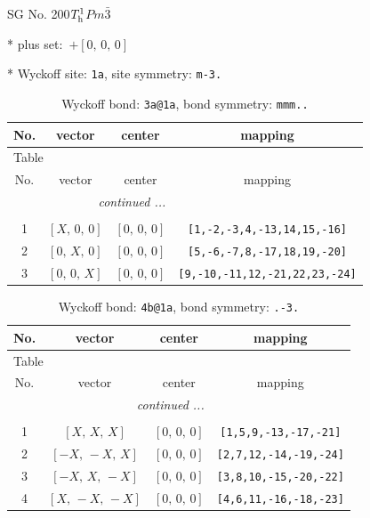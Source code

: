 \documentclass[fleqn,8pt]{jsarticle}
\begin{document}
\setcounter{MaxMatrixCols}{32}

\renewcommand{\tablename}{Table~}
\renewcommand{\figurename}{Figure~}
\begin{center}
\LARGE
SG No. 200\quad$T_{\rm h}^{1}$\quad$Pm\bar{3}$\quad[ cubic ]
\end{center}

* plus set:\,\,\,$+\left[ 0,\, 0,\, 0 \right]$


* Wyckoff site: {\tt 1a}, site symmetry: {\tt m-3.}
\renewcommand{\arraystretch}{1.2}
\begin{longtable}{cccc}
\caption{Wyckoff bond: {\tt 3a@1a}, bond symmetry: {\tt mmm..}}
 \\
 \hline \hline
No. & vector & center & mapping \\ \hline \endfirsthead

\multicolumn{3}{l}{\tablename\ \thetable{}} \\
 \hline \hline
No. & vector & center & mapping \\ \hline \endhead

 \hline \hline
\multicolumn{3}{r}{\footnotesize\it continued ...} \\ \endfoot

 \hline \hline
\multicolumn{3}{r}{} \\ \endlastfoot

1 & $\left[ X,\, 0,\, 0 \right]$ & $\left[ 0,\, 0,\, 0 \right]$ & {\tt [1,-2,-3,4,-13,14,15,-16]} \\ \hline
2 & $\left[ 0,\, X,\, 0 \right]$ & $\left[ 0,\, 0,\, 0 \right]$ & {\tt [5,-6,-7,8,-17,18,19,-20]} \\ \hline
3 & $\left[ 0,\, 0,\, X \right]$ & $\left[ 0,\, 0,\, 0 \right]$ & {\tt [9,-10,-11,12,-21,22,23,-24]} \\
\end{longtable}
\renewcommand{\arraystretch}{1.2}
\begin{longtable}{cccc}
\caption{Wyckoff bond: {\tt 4b@1a}, bond symmetry: {\tt .-3.}}
 \\
 \hline \hline
No. & vector & center & mapping \\ \hline \endfirsthead

\multicolumn{3}{l}{\tablename\ \thetable{}} \\
 \hline \hline
No. & vector & center & mapping \\ \hline \endhead

 \hline \hline
\multicolumn{3}{r}{\footnotesize\it continued ...} \\ \endfoot

 \hline \hline
\multicolumn{3}{r}{} \\ \endlastfoot

1 & $\left[ X,\, X,\, X \right]$ & $\left[ 0,\, 0,\, 0 \right]$ & {\tt [1,5,9,-13,-17,-21]} \\ \hline
2 & $\left[ - X,\, - X,\, X \right]$ & $\left[ 0,\, 0,\, 0 \right]$ & {\tt [2,7,12,-14,-19,-24]} \\ \hline
3 & $\left[ - X,\, X,\, - X \right]$ & $\left[ 0,\, 0,\, 0 \right]$ & {\tt [3,8,10,-15,-20,-22]} \\ \hline
4 & $\left[ X,\, - X,\, - X \right]$ & $\left[ 0,\, 0,\, 0 \right]$ & {\tt [4,6,11,-16,-18,-23]} \\
\end{longtable}
\end{document}
